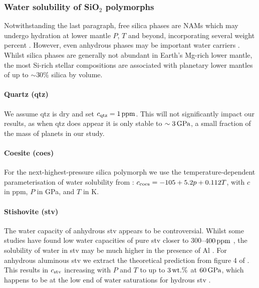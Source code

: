 \subsubsection{Water solubility of SiO$_2$ polymorphs}\label{sec:methods_sio2}

Notwithstanding the last paragraph, free silica phases are NAMs which may undergo hydration at lower mantle $P$, $T$ and beyond, incorporating several weight percent  \citep{nisr_large_2020}. However, even anhydrous  phases may be important water carriers \citep{panero_hydrogen_2004, litasov_high_2007}. Whilst silica phases are generally not abundant in Earth's Mg-rich lower mantle, the most Si-rich stellar compositions are associated with planetary lower mantles of up to $\sim$30\% silica by volume. %

\paragraph{Quartz (qtz)}

We assume qtz is dry and set $c_{\rm qtz} = 1\,{\rm ppm}$. This will not significantly impact our results, as when qtz does appear it is only stable to $\sim3\,{\rm GPa}$, a small fraction of the mass of planets in our study.

\paragraph{Coesite (coes)}

For the next-highest-pressure silica polymorph we use the temperature-dependent parameterisation of water solubility from \citet{yan_water_2021}: $c_{\rm coes} = -105 + 5.2 p + 0.112 T$, with $c$ in ppm, $P$ in GPa, and $T$ in K.

\paragraph{Stishovite (stv)}

The water capacity of anhydrous stv appears to be controversial. Whilst some studies have found low water capacities of pure stv closer to 300--$400\,{\rm ppm}$ \citep{liu_bridgmanite_2021}, the solubility of water in stv may be much higher in the presence of Al \citep{litasov_high_2007}. For anhydrous aluminous stv we extract the theoretical prediction from figure 4 of \citet{panero_hydrogen_2004}. This results in $c_{\rm stv}$ increasing with $P$ and $T$ to up to $3\,{\rm wt.\%}$ at $60\,{\rm GPa}$, which happens to be at the low end of water saturations for hydrous stv \citep{lin_evidence_2020}. 

